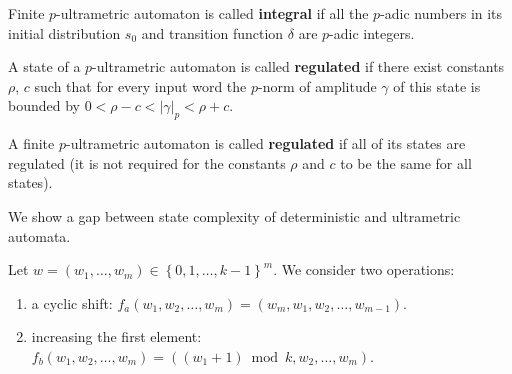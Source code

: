 \documentclass{llncs}
\begin{document}
\begin{definition}
Finite $p$-ultrametric automaton is called {\bf integral} if all the $p$-adic numbers in its initial distribution $s_0$ and transition function $\delta$ are $p$-adic integers.
\end{definition}

\begin{definition}
A state of a $p$-ultrametric automaton is called {\bf regulated} if there exist constants $\rho$, $c$ such that for every input word the $p$-norm of amplitude $\gamma$ of this state is bounded by $0 < \rho -c < |\gamma |_p < \rho +c$.

A finite $p$-ultrametric automaton is called {\bf regulated} if all of its states are regulated (it is not required for the constants $\rho$ and $c$ to be the same for all states).
\end{definition}

We show a gap between state complexity of deterministic and ultrametric automata.

Let $w = \left( w_1, \ldots, w_m \right) \in \left\{ 0, 1, \ldots, k-1 \right\} ^ m$.
We consider two operations:
\begin{enumerate}[itemsep=9pt,label=\alph*)]
  \item a cyclic shift: $f_a \left( w_1, w_2, \ldots, w_{m} \right) = \left( w_{m}, w_1, w_2, \ldots, w_{m-1} \right)$.
  \item increasing the first element: $f_b \left( w_1, w_2, \ldots, w_{m} \right) = ( \left( w_1 + 1 \right) \bmod k, w_2,\ldots, \allowbreak w_{m} )$.
\end{enumerate}
\end{document}
